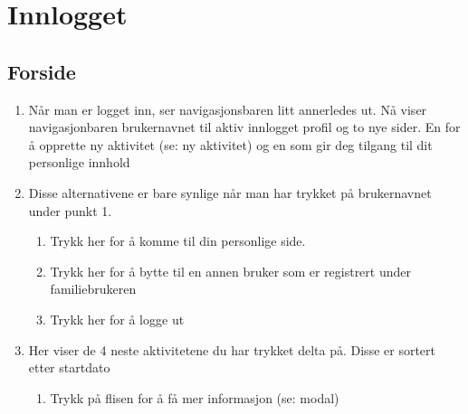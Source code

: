 
\section{Innlogget}

\subsection{Forside}
\begin{center}
\end{center}
\begin{enumerate}[nosep]
    \item Når man er logget inn, ser navigasjonsbaren litt annerledes ut. Nå viser navigasjonbaren brukernavnet til aktiv innlogget profil og to nye sider. En for å opprette ny aktivitet (se: ny aktivitet) og en som gir deg tilgang til dit personlige innhold
    \item Disse alternativene er bare synlige når man har trykket på brukernavnet under punkt 1.
    \begin{enumerate}
        \item Trykk her for å komme til din personlige side.
        \item Trykk her for å bytte til en annen bruker som er registrert under familiebrukeren
        \item Trykk her for å logge ut
    \end{enumerate}
    \item Her viser de 4 neste aktivitetene du har trykket delta på. Disse er sortert etter startdato
    \begin{enumerate}
        \item Trykk på flisen for å få mer informasjon (se: modal)
    \end{enumerate}
\end{enumerate}

